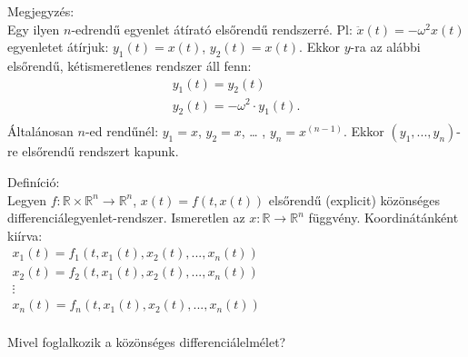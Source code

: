 \documentclass[12pt,a4paper]{scrartcl}
\newenvironment{definicio}{}{}
\newenvironment{megjegyzes}{}{}
\begin{document}
\begin{megjegyzes}

Megjegyzés:\\
Egy ilyen \(n\)-edrendű egyenlet átírató elsőrendű rendszerré. Pl:
\(\ddot x\left( t \right) = - {\omega ^2}x\left( t \right)\) egyenletet
átírjuk: \(y_{1}\left( t \right) = x\left( t \right)\),
\(y_{2}\left( t \right) = \overset{}{x}\left( t \right)\). Ekkor
\(y\)-ra az alábbi elsőrendű, kétismeretlenes rendszer áll fenn:
\[\begin{array}{l}
{y_{1}\left( t \right) = y_{2}\left( t \right)} \\
{y_{2}\left( t \right) = - \omega^{2} \cdot y_{1}{\left( t \right).}} \\
\end{array}\] Általánosan \(n\)-ed rendűnél: \(y_{1} = x\),
\(y_{2} = \overset{}{x}\), \ldots{} , \(y_{n} = x^{({n - 1})}\). Ekkor
\(\left( {y_{1},...,y_{n}} \right)\)-re elsőrendű rendszert kapunk.

\end{megjegyzes}

\begin{definicio}

Definíció:\\
Legyen
\(\left. f:{\mathbb{R}} \times {\mathbb{R}}^{n}\rightarrow{\mathbb{R}}^{n} \right.\),
\(\overset{}{x}\left( t \right) = f\left( {t,x\left( t \right)} \right)\)
elsőrendű (explicit) közönséges differenciálegyenlet-rendszer.
Ismeretlen az
\(\left. x:{\mathbb{R}}\rightarrow{\mathbb{R}}^{n} \right.\) függvény.
Koordinátánként kiírva:\\
\(\begin{array}{l} {{\overset{}{x}}_{1}\left( t \right) = f_{1}\left( {t,x_{1}\left( t \right),x_{2}\left( t \right),...,x_{n}\left( t \right)} \right)} \\ {{\overset{}{x}}_{2}\left( t \right) = f_{2}\left( {t,x_{1}\left( t \right),x_{2}\left( t \right),...,x_{n}\left( t \right)} \right)} \\  \vdots \\ {{\overset{}{x}}_{n}\left( t \right) = f_{n}\left( {t,x_{1}\left( t \right),x_{2}\left( t \right),...,x_{n}\left( t \right)} \right)} \\ \end{array}\)

\end{definicio}

Mivel foglalkozik a közönséges differenciálelmélet?
\end{document}
